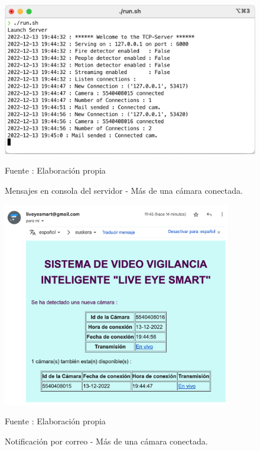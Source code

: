 \begin{figure}[H]
    \begin{center}
        \includegraphics[width=12cm]{img/capitulo_6/server_cam_connected_more_cams.png}
    \end{center}
    \begin{center}
        \caption{Mensajes en consola del servidor - Más de una cámara conectada.}
        Fuente : Elaboración propia
    \end{center}
\end{figure}

\begin{figure}[H]
    \begin{center}
        \includegraphics[width=10cm]{img/capitulo_6/mail2.png}
    \end{center}
    \begin{center}
        \caption{Notificación por correo - Más de una cámara conectada.}
        Fuente : Elaboración propia
    \end{center}
\end{figure}


